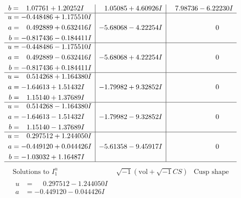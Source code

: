 \documentclass[1p]{elsarticle_modified}
\theoremstyle{definition}
\newcommand{\I}{\sqrt{-1}}
\begin{document}
$$\begin{array}{c|c|c}
\begin{aligned}
b &= \phantom{-}1.07761 + 1.20252 I\end{aligned}
 & \phantom{-}1.05085 + 4.60926 I & \phantom{-}7.98736 - 6.22230 I \\ \hline\begin{aligned}
u &= -0.448486 + 1.175510 I \\
a &= \phantom{-}0.492889 + 0.632416 I \\
b &= -0.817436 - 0.184411 I\end{aligned}
 & -5.68068 - 4.22254 I & \phantom{-0.000000 } 0 \\ \hline\begin{aligned}
u &= -0.448486 - 1.175510 I \\
a &= \phantom{-}0.492889 - 0.632416 I \\
b &= -0.817436 + 0.184411 I\end{aligned}
 & -5.68068 + 4.22254 I & \phantom{-0.000000 } 0 \\ \hline\begin{aligned}
u &= \phantom{-}0.514268 + 1.164380 I \\
a &= -1.64613 + 1.51432 I \\
b &= \phantom{-}1.15140 + 1.37689 I\end{aligned}
 & -1.79982 + 9.32852 I & \phantom{-0.000000 } 0 \\ \hline\begin{aligned}
u &= \phantom{-}0.514268 - 1.164380 I \\
a &= -1.64613 - 1.51432 I \\
b &= \phantom{-}1.15140 - 1.37689 I\end{aligned}
 & -1.79982 - 9.32852 I & \phantom{-0.000000 } 0 \\ \hline\begin{aligned}
u &= \phantom{-}0.297512 + 1.244050 I \\
a &= -0.449120 + 0.044426 I \\
b &= -1.03032 + 1.16487 I\end{aligned}
 & -5.61358 - 9.45917 I & \phantom{-0.000000 } 0\\
 \hline 
 \end{array}$$\newpage$$\begin{array}{c|c|c}  
\text{Solutions to }I^u_{1}& \I (\text{vol} + \sqrt{-1}CS) & \text{Cusp shape}\\
 \hline 
\begin{aligned}
u &= \phantom{-}0.297512 - 1.244050 I \\
a &= -0.449120 - 0.044426 I \\

\end{aligned}
\end{array}$$
\end{document}
